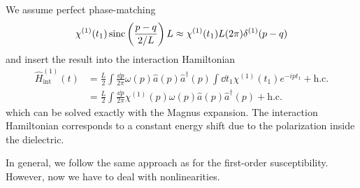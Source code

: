 We assume perfect phase-matching
\begin{equation}
	\chi^{(1)}(t_1)
	\operatorname{sinc}\left(\frac{p-q}{2/L}\right)
	L
	\approx
	\chi^{(1)}(t_1)L
	(2\pi)
	\delta^{(1)}(p-q)
\end{equation}
and insert the result into the interaction Hamiltonian
\begin{equation}
	\begin{split}
		\hat{H}_\text{int}^{(1)}(t)
		&=
		\frac{L}{2}
		\int\frac{\dd{p}}{2\pi}
		\omega(p)
		\hat{a}(p)
		\hat{a}^\dagger(p)
		\int\dd{t_1}
		\chi^{(1)}(t_1)
		e^{-ipt_1}
		+
		\text{h.c.}
		\\
		&=
		\frac{L}{2}
		\int\frac{\dd{p}}{2\pi}
		\chi^{(1)}(p)
		\omega(p)
		\hat{a}(p)
		\hat{a}^\dagger(p)
		+
		\text{h.c.}
	\end{split}
\end{equation}
which can be solved exactly with the Magnus expansion.
The interaction Hamiltonian corresponds to a constant energy shift due to the polarization inside the dielectric.

In general, we follow the same approach as for the first-order susceptibility.
However, now we have to deal with nonlinearities.

